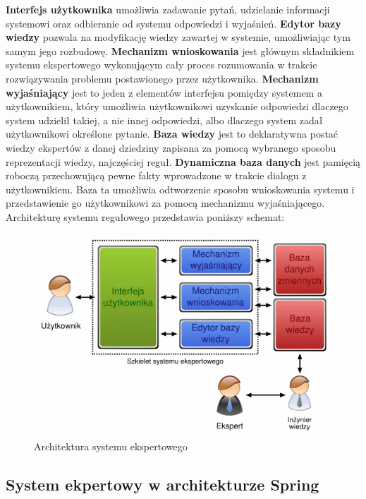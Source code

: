 \textbf{Interfejs użytkownika} umożliwia zadawanie pytań, udzielanie informacji systemowi oraz odbieranie od systemu odpowiedzi i wyjaśnień.
\textbf{Edytor bazy wiedzy} pozwala na modyfikację wiedzy zawartej w systemie, umożliwiając tym samym jego rozbudowę.
\textbf{Mechanizm wnioskowania} jest głównym składnikiem systemu ekspertowego wykonującym cały proces rozumowania w trakcie rozwiązywania problemu postawionego przez użytkownika.
\textbf{Mechanizm wyjaśniający} jest to jeden z elementów interfejsu pomiędzy systemem a użytkownikiem, który umożliwia użytkownikowi uzyskanie odpowiedzi dlaczego system udzielił takiej, a nie innej odpowiedzi, albo dlaczego system zadał użytkownikowi określone pytanie.
\textbf{Baza wiedzy} jest to deklaratywna postać wiedzy ekspertów z danej dziedziny zapisana za pomocą wybranego sposobu reprezentacji wiedzy, najczęściej reguł.
\textbf{Dynamiczna baza danych} jest pamięcią roboczą przechowującą pewne fakty wprowadzone w trakcie dialogu z użytkownikiem. Baza ta umożliwia odtworzenie sposobu wnioskowania systemu i przedstawienie go użytkownikowi za pomocą mechanizmu wyjaśniającego.
Architekturę systemu regułowego przedstawia poniższy schemat:
\begin{figure}[!ht]
\label{img:rysunek_expert}	
\includegraphics[scale=0.5]{images/expert-system}
\caption[Rysunek przedstawiający model architektury systemu ekspertowego]{Architektura systemu ekspertowego}
\end{figure}

\subsection{System ekpertowy w architekturze Spring}
\label{sec:systemEkpertowyArchitekturaSpring}

